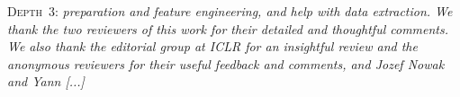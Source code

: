 \noindent\textsc{Depth~3:} {\small\itshape preparation and feature engineering, and help with data extraction. We thank the two reviewers of this work for their detailed and thoughtful comments. We also thank the editorial group at ICLR for an insightful review and the anonymous reviewers for their useful feedback and comments, and Jozef Nowak and Yann [...]}

\medskip
